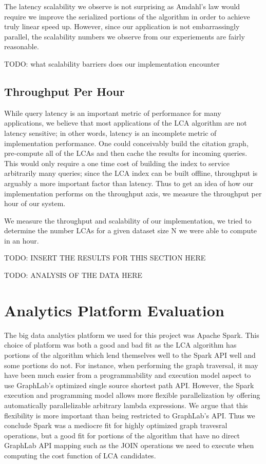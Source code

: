 \documentclass{article}
\begin{document}
The latency scalability we observe is not surprising as Amdahl's law would require we improve the serialized portions of the algorithm in order to achieve truly linear speed up.
However, since our application is not embarrassingly parallel, the scalability numbers we observe from our experiements are fairly reasonable.

TODO: what scalability barriers does our implementation encounter

\subsection{Throughput Per Hour}

While query latency is an important metric of performance for many applications, we believe that most applications of the LCA algorithm are not latency sensitive; in other words, latency is an incomplete metric of implementation performance.
One could conceivably build the citation graph, pre-compute all of the LCAs and then cache the results for incoming queries.
This would only require a one time cost of building the index to service arbitrarily many queries; since the LCA index can be built offline, throughput is arguably a more important factor than latency.
Thus to get an idea of how our implementation performs on the throughput axis, we measure the throughput per hour of our system.

We measure the throughput and scalability of our implementation, we tried to determine the number LCAs for a given dataset size N we were able to compute in an hour.



TODO: INSERT THE RESULTS FOR THIS SECTION HERE

TODO: ANALYSIS OF THE DATA HERE

\section{Analytics Platform Evaluation}

The big data analytics platform we used for this project was Apache Spark.
This choice of platform was both a good and bad fit as the LCA algorithm has portions of the algorithm which lend themselves well to the Spark API well and some portions do not.
For instance, when performing the graph traversal, it may have been much easier from a programmability and execution model aspect to use GraphLab's optimized single source shortest path API.
However, the Spark execution and programming model allows more flexible parallelization by offering automatically parallelizable arbitrary lambda expressions.
We argue that this flexibility is more important than being restricted to GraphLab's API.
Thus we conclude Spark was a mediocre fit for highly optimized graph travesral operations, but a good fit for portions of the algorithm that have no direct GraphLab API mapping such as the JOIN operations we need to execute when computing the cost function of LCA candidates.
\end{document}
